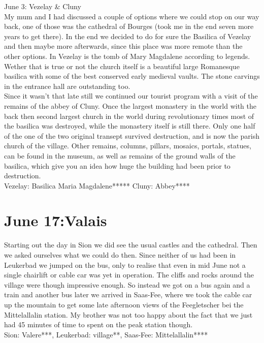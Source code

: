 June 3: Vezelay \& Cluny\\
My mum and I had discussed a couple of options where we could stop on our way back, one of those was the cathedral of Bourges (took me in the end seven more years to get there). In the end we decided to do for sure the Basilica of Vezelay and then maybe more afterwards, since this place was more remote than the other options. In Vezelay is the tomb of Mary Magdalene according to legends. Wether that is true or not the church itself is a beautiful large Romanesque basilica with some of the best conserved early medieval vaults. The stone carvings in the entrance hall are outstanding too.\\
Since it wasn't that late still we continued our tourist program with a visit of the remains of the abbey of Cluny. Once the largest monastery in the world with the back then second largest church in the world during revolutionary times most of the basilica was destroyed, while the monastery itself is still there. Only one half of the one of the two original transept survived destruction, and is now the parish church of the village. Other remains, columns, pillars, mosaics, portals, statues, can be found in the museum, as well as remains of the ground walls of the basilica, which give you an idea how huge the building had been prior to destruction.\\

Vezelay: Basilica Maria Magdalene*****
Cluny: Abbey****

\section{June 17:Valais}
\label{Valais2012}

Starting out the day in Sion we did see the usual castles and the cathedral. Then we asked ourselves what we could do then. Since neither of us had been in Leukerbad we jumped on the bus, only to realise that even in mid June not a single chairlift or cable car was yet in operation. The cliffs and rocks around the village were though impressive enough. So instead we got on a bus again and a train and another bus later we arrived in Saas-Fee, where we took the cable car up the mountain to get some late afternoon views of the Feegletscher bei the Mittelallalin station. My brother was not too happy about the fact that we just had 45 minutes of time to spent on the peak station though.\\

Sion: Valere***, Leukerbad: village**, Saas-Fee: Mittelallalin****

